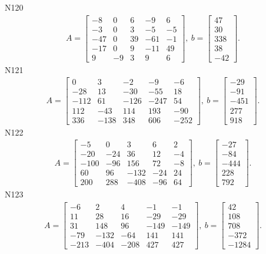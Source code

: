 \documentclass[11pt]{report}
\begin{document}
N120
\begin{align*}
 A = \left[\begin{matrix}-8 & 0 & 6 & -9 & 6\\-3 & 0 & 3 & -5 & -5\\-47 & 0 & 39 & -61 & -1\\-17 & 0 & 9 & -11 & 49\\9 & -9 & 3 & 9 & 6\end{matrix}\right],
\ b = \left[\begin{matrix}47\\30\\338\\38\\-42\end{matrix}\right]. 
 \end{align*}
N121
\begin{align*}
 A = \left[\begin{matrix}0 & 3 & -2 & -9 & -6\\-28 & 13 & -30 & -55 & 18\\-112 & 61 & -126 & -247 & 54\\112 & -43 & 114 & 193 & -90\\336 & -138 & 348 & 606 & -252\end{matrix}\right],
\ b = \left[\begin{matrix}-29\\-91\\-451\\277\\918\end{matrix}\right]. 
 \end{align*}
N122
\begin{align*}
 A = \left[\begin{matrix}-5 & 0 & 3 & 6 & 2\\-20 & -24 & 36 & 12 & -4\\-100 & -96 & 156 & 72 & -8\\60 & 96 & -132 & -24 & 24\\200 & 288 & -408 & -96 & 64\end{matrix}\right],
\ b = \left[\begin{matrix}-27\\-84\\-444\\228\\792\end{matrix}\right]. 
 \end{align*}
N123
\begin{align*}
 A = \left[\begin{matrix}-6 & 2 & 4 & -1 & -1\\11 & 28 & 16 & -29 & -29\\31 & 148 & 96 & -149 & -149\\-79 & -132 & -64 & 141 & 141\\-213 & -404 & -208 & 427 & 427\end{matrix}\right],
\ b = \left[\begin{matrix}42\\108\\708\\-372\\-1284\end{matrix}\right]. 
 \end{align*}
\end{document}
